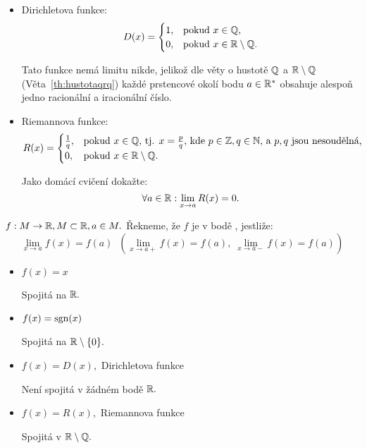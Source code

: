 \begin{remark}
\begin{itemize}
        \item Dirichletova funkce:
            $$D(x) = \begin{cases}
                1, & \text{pokud $x \in \mathbb{Q},$} \\
                0, & \text{pokud $x \in \mathbb{R} \setminus \mathbb{Q}.$}
            \end{cases}$$

            Tato funkce nemá limitu nikde, jelikož dle věty o hustotě $\mathbb{Q}$ 
            a $\mathbb{R} \setminus \mathbb{Q}$ (Věta~\ref{th:hustotaqrq})
            každé prstencové okolí bodu 
            $a\in \mathbb{R}^*$ obsahuje alespoň jedno racionální a iracionální číslo.
            
        \item Riemannova funkce:
            $$R(x) = \begin{cases}
                \frac{1}{q}, & \text{pokud $x \in \mathbb{Q},$ tj. $x = \frac{p}{q},$ kde
                $p \in \mathbb{Z}, q\in\mathbb{N},$ a $p,q$ jsou nesoudělná,}\\
                0, & \text{pokud $x \in \mathbb{R} \setminus \mathbb{Q}.$}
            \end{cases}$$

            Jako domácí cvičení dokažte:
            $$\forall a \in \mathbb{R}: \lim_{x \to a} R(x) = 0.$$
    \end{itemize}
\end{remark}

\begin{definition}
    \Necht $f:M \rightarrow \mathbb{R}, M \subset \mathbb{R}, a \in M.$ Řekneme, že $f$ je v 
    bodě , jestliže:
    $$\lim_{x \to a} f(x) = f(a) \;\; (\lim_{x \to a+} f(x) = f(a),\;
    \lim_{x \to a-} f(x) = f(a))$$
\end{definition}

\begin{remark}
    \leavevmode
    \begin{itemize}
        \item $f(x) = x$

            Spojitá na $\mathbb{R}.$

        \item $f(x) = \operatorname{sgn}(x)$

            Spojitá na $\mathbb{R} \setminus \{0\}.$

        \item $f(x) = D(x),$ Dirichletova funkce

            Není spojitá v žádném bodě $\mathbb{R}.$

        \item $f(x) = R(x),$ Riemannova funkce

            Spojitá v $\mathbb{R} \setminus \mathbb{Q}.$
    \end{itemize}
\end{remark}

